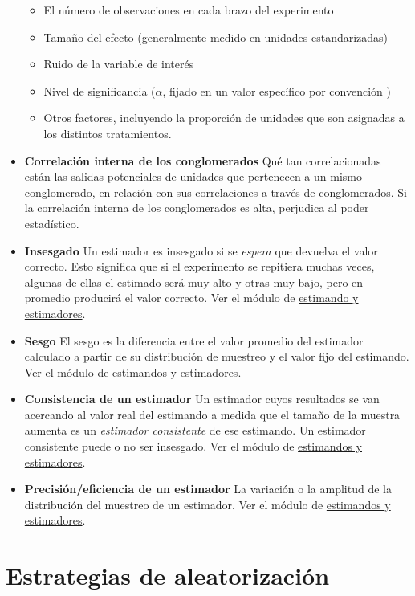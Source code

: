 \documentclass[12pt,spanish,]{book}
\providecommand{\tightlist}{%
  \setlength{\itemsep}{0pt}\setlength{\parskip}{0pt}}
\begin{document}
\begin{itemize}
  \begin{itemize}
  \tightlist
  \item
    El número de observaciones en cada brazo del experimento
  \item
    Tamaño del efecto (generalmente medido en unidades estandarizadas)
  \item
    Ruido de la variable de interés
  \item
    Nivel de significancia (\(\alpha\), fijado en un valor específico por convención )
  \item
    Otros factores, incluyendo la proporción de unidades que son asignadas a los distintos tratamientos.
  \end{itemize}
\item
  \textbf{Correlación interna de los conglomerados} Qué tan correlacionadas están las salidas potenciales de unidades que pertenecen a un mismo conglomerado, en relación con sus correlaciones a través de conglomerados. Si la correlación interna de los conglomerados es alta, perjudica al poder estadístico.
\item
  \textbf{Insesgado} Un estimador es insesgado si se \emph{espera} que devuelva el valor correcto. Esto significa que si el experimento se repitiera muchas veces, algunas de ellas el estimado será muy alto y otras muy bajo, pero en promedio producirá el valor correcto. Ver el módulo de \href{estimandos-y-estimadores.html}{estimando y estimadores}.
\item
  \textbf{Sesgo} El sesgo es la diferencia entre el valor promedio del estimador calculado a partir de su distribución de muestreo y el valor fijo del estimando. Ver el módulo de \href{estimandos-y-estimadores.html}{estimandos y estimadores}.
\item
  \textbf{Consistencia de un estimador} Un estimador cuyos resultados se van acercando al valor real del estimando a medida que el tamaño de la muestra aumenta es un \emph{estimador consistente} de ese estimando. Un estimador consistente puede o no ser insesgado. Ver el módulo de \href{estimandos-y-estimadores.html}{estimandos y estimadores}.
\item
  \textbf{Precisión/eficiencia de un estimador} La variación o la amplitud de la distribución del muestreo de un estimador. Ver el módulo de \href{estimandos-y-estimadores.html}{estimandos y estimadores}.
\end{itemize}

\hypertarget{estrategias-de-aleatorizaciuxf3n}{%
\section{Estrategias de aleatorización}\label{estrategias-de-aleatorizaciuxf3n}}
\end{document}
